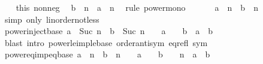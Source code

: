 \begin{isabellebody}
\ \ \isamarkupfalse%
\ this\ nonneg\ \isamarkupfalse%
\ {\isachardoublequoteopen}b\ {\isacharcircum}{\kern0pt}\ n\ {\isasymle}\ a\ {\isacharcircum}{\kern0pt}\ n{\isachardoublequoteclose}\ \isamarkupfalse%
\ {\isacharparenleft}{\kern0pt}rule\ power{\isacharunderscore}{\kern0pt}mono{\isacharparenright}{\kern0pt}\isanewline
\ \ \isamarkupfalse%
\ \isamarkupfalse%
\ {\isachardoublequoteopen}{\isasymnot}\ a\ {\isacharcircum}{\kern0pt}\ n\ {\isacharless}{\kern0pt}\ b\ {\isacharcircum}{\kern0pt}\ n{\isachardoublequoteclose}\ \isamarkupfalse%
\ {\isacharparenleft}{\kern0pt}simp\ only{\isacharcolon}{\kern0pt}\ linorder{\isacharunderscore}{\kern0pt}not{\isacharunderscore}{\kern0pt}less{\isacharparenright}{\kern0pt}\isanewline
{}\isamarkupfalse%
%
\endisatagproof
{\isafoldproof}%
%
\isadelimproof
\isanewline
%
\endisadelimproof
\isanewline
{}\isamarkupfalse%
\ power{\isacharunderscore}{\kern0pt}inject{\isacharunderscore}{\kern0pt}base{\isacharcolon}{\kern0pt}\ {\isachardoublequoteopen}a\ {\isacharcircum}{\kern0pt}\ Suc\ n\ {\isacharequal}{\kern0pt}\ b\ {\isacharcircum}{\kern0pt}\ Suc\ n\ {\isasymLongrightarrow}\ {}\ {\isasymle}\ a\ {\isasymLongrightarrow}\ {}\ {\isasymle}\ b\ {\isasymLongrightarrow}\ a\ {\isacharequal}{\kern0pt}\ b{\isachardoublequoteclose}\isanewline
%
\isadelimproof
\ \ %
\endisadelimproof
%
\isatagproof
{}\isamarkupfalse%
\ {\isacharparenleft}{\kern0pt}blast\ intro{\isacharcolon}{\kern0pt}\ power{\isacharunderscore}{\kern0pt}le{\isacharunderscore}{\kern0pt}imp{\isacharunderscore}{\kern0pt}le{\isacharunderscore}{\kern0pt}base\ order{\isachardot}{\kern0pt}antisym\ eq{\isacharunderscore}{\kern0pt}refl\ sym{\isacharparenright}{\kern0pt}%
\endisatagproof
{\isafoldproof}%
%
\isadelimproof
\isanewline
%
\endisadelimproof
\isanewline
{}\isamarkupfalse%
\ power{\isacharunderscore}{\kern0pt}eq{\isacharunderscore}{\kern0pt}imp{\isacharunderscore}{\kern0pt}eq{\isacharunderscore}{\kern0pt}base{\isacharcolon}{\kern0pt}\ {\isachardoublequoteopen}a\ {\isacharcircum}{\kern0pt}\ n\ {\isacharequal}{\kern0pt}\ b\ {\isacharcircum}{\kern0pt}\ n\ {\isasymLongrightarrow}\ {}\ {\isasymle}\ a\ {\isasymLongrightarrow}\ {}\ {\isasymle}\ b\ {\isasymLongrightarrow}\ {}\ {\isacharless}{\kern0pt}\ n\ {\isasymLongrightarrow}\ a\ {\isacharequal}{\kern0pt}\ b{\isachardoublequoteclose}\isanewline
%
\isadelimproof
\ \ %
\endisadelimproof
%
\isatagproof
{}\isamarkupfalse%

\end{isabellebody}
